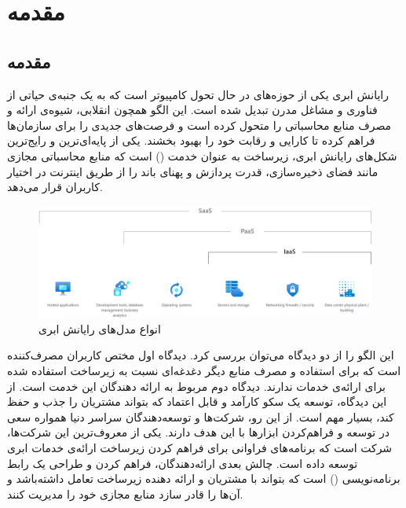\chapter{مقدمه}
\section{مقدمه}
رایانش ابری یکی از حوزه‌های در حال تحول کامپیوتر است که به یک جنبه‌ی حیاتی از فناوری و مشاغل مدرن تبدیل شده است. این الگو همچون انقلابی، شیوه‌ی ارائه و مصرف منابع محاسباتی را متحول کرده است و فرصت‌های جدیدی را برای سازمان‌ها فراهم کرده تا کارایی و رقابت خود را بهبود بخشند. یکی از پایه‌ای‌ترین و رایج‌ترین شکل‌های رایانش ابری، زیرساخت به عنوان خدمت () است که منابع محاسباتی مجازی مانند فضای ذخیره‌سازی، قدرت پردازش و پهنای باند را از طریق اینترنت در اختیار کاربران قرار می‌دهد\cite{Mell_2011}.

\begin{figure}[h]
	\vspace{1cm}
	\centering
	\includegraphics[scale=0.35]{figures/cloud_computing_models.png}
	\caption{انواع مدل‌های رایانش ابری\cite{microsoft_cc_models}}
	\label{fig:cc_models}
\end{figure}

این الگو را از دو دیدگاه می‌توان بررسی کرد. دیدگاه اول مختص کاربران مصرف‌کننده است که برای استفاده و مصرف منابع دیگر دغدغه‌ای نسبت به زیرساخت استفاده شده برای ارائه‌ی خدمات ندارند. دیدگاه دوم مربوط به ارائه دهندگان این خدمت است. از این دیدگاه، توسعه یک سکو کارآمد و قابل اعتماد که بتواند مشتریان را جذب و حفظ کند، بسیار مهم است. از این رو، شرکت‌ها و توسعه‌دهندگان سراسر دنیا همواره سعی در توسعه و فراهم‌کردن ابزارها با این هدف دارند. یکی از معروف‌ترین این شرکت‌ها، شرکت  است که برنامه‌های فراوانی برای فراهم کردن زیرساخت ارائه‌ی خدمات ابری توسعه داده است. چالش بعدی ارائه‌دهندگان، فراهم کردن و طراحی یک رابط برنامه‌نویسی () است که بتواند با مشتریان و ارائه دهنده زیرساخت تعامل داشته‌باشد و آن‌ها را قادر سازد منابع مجازی خود را مدیریت کنند.
